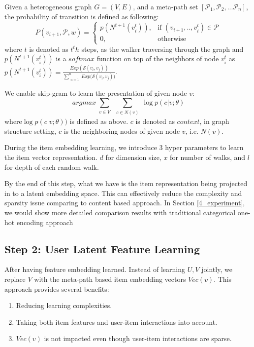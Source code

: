 Given a heterogeneous graph $G = (V,E)$, and a meta-path set $[\mathcal{P}_1, \mathcal{P}_2, ... \mathcal{P}_n]$, the probability of transition is defined as following:
\begin{equation}\label{hetewalker}
    P(v_{i+1},\mathcal{P},w)= 
        \begin{cases}
            p({N^{t+1}(v_{i}^t)}),& \text{if } (v_{i+1}, .., v_{i}^t) \in \mathcal{P} \\
            0,              & \text{otherwise}
        \end{cases}
\end{equation}
where $t$ is denoted as $t^th$ steps, as the walker traversing through the graph and $p({N^{t+1}(v_{i}^t)})$ is a $softmax$ function on top of the neighbors of node $v_{i}^t$ as $p({N^{t+1}(v_{i}^t)}) = \frac{Exp(\mathcal{S}(v_i,v_j))}{\sum\limits_{\substack{n=1}}^{n} {Exp(\mathcal{S}(v_i,v_j)})}$.

We enable skip-gram to learn the presentation of given node $v$:
\begin{equation}\label{skipgram}
    arg max
    \sum\limits_{\substack{v \in V}}
    \sum\limits_{\substack{c \in N(v)}}
    \log p({c|v;\theta})
\end{equation}
where$\log p({c|v;\theta}))$ is defined as above. $c$ is denoted as $context$, in graph structure setting, $c$ is the neighboring nodes of given node $v$, i.e. $N(v)$. 

During the item embedding learning, we introduce 3 hyper parameters to learn the item vector representation. $d$ for dimension size, $x$ for number of walks, and $l$ for depth of each random walk.

By the end of this step, what we have is the item representation being projected in to a latent embedding space. This can effectively reduce the complexity and sparsity issue comparing to content based approach. In Section \ref{4_experiment}, we would show more detailed comparison results with traditional categorical one-hot encoding approach

\subsection{Step 2: User Latent Feature Learning}\label{3PCC}
After having feature embedding learned. Instead of learning $U, V$ jointly, we replace $V$ with the meta-path based item embedding vectors $Vec(v)$. This approach provides several benefits:
\begin{enumerate}
    \item Reducing learning complexities.
    \item Taking both item features and user-item interactions into account.
    \item $Vec(v)$ is not impacted even though user-item interactions are sparse.
\end{enumerate}

